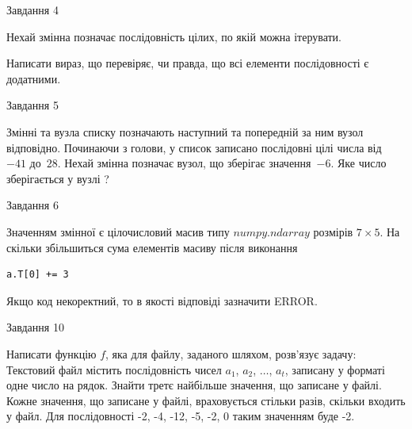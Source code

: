 \documentclass[12pt, ukrainian]{article}
\begin{document}
{\begin{minipage}[t]{8.0cm}
\end{minipage}


               
{\begin{center}Завдання {4}\end{center}}
\vspace{-4mm}
Нехай змінна  позначає послідовність цілих, по якій можна ітерувати.

Написати вираз, що перевіряє, чи правда, що всі елементи послідовності є додатни\-ми.\par

\vspace{10mm}
               
{\begin{center}Завдання {5}\end{center}}
\vspace{-4mm}
Змінні  та  вузла списку позначають наступний та попередній за ним вузол відповідно. Починаючи з голови, у список записано послідовні цілі числа від~$-41$ до~$28$. Нехай змінна  позначає вузол, що зберігає значення~$-6$.
Яке число зберігається у вузлі  ?\par

               
{\begin{center}Завдання {6}\end{center}}
\vspace{-4mm}
Значенням змінної  є цілочисловий масив типу $numpy.ndarray$ розмірів $7{\times}5$. На скільки збільшиться сума елементів масиву  після виконання
\begin{verbatim}
a.T[0] += 3
\end{verbatim}


Якщо код некоректний, то в якості відповіді зазначити ERROR.\par

               
{\begin{center}Завдання {10}\end{center}}
\vspace{-4mm}

Написати функцію $f$, яка для файлу, заданого шляхом, розв’язує задачу:\\ Текстовий файл містить послідовність чисел $a_1$, $a_2$, $\ldots$, $a_t$, записану у форматі одне число на рядок. Знайти третє найбільше значення, що записане у файлі. Кожне значення, що записане у файлі, враховується стільки разів, скільки входить у файл. Для послідовності -2, -4, -12, -5, -2, 0 таким значенням буде -2.

}
\end{document}
